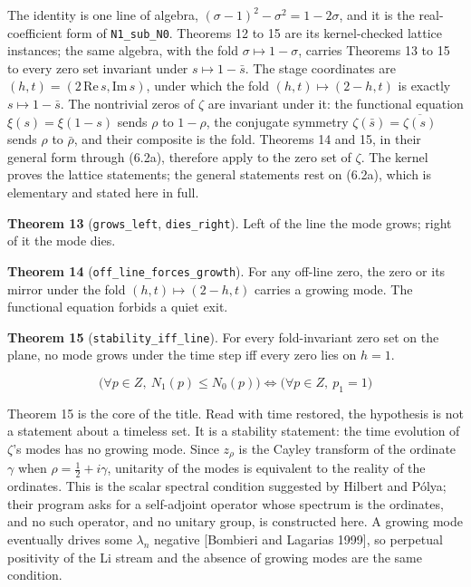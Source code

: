\documentclass[10pt,twocolumn]{article}
\begin{document}
The identity is one line of algebra,
\((\sigma - 1)^2 - \sigma^2 = 1 - 2\sigma\), and it is the
real-coefficient form of \texttt{N1\_sub\_N0}. Theorems 12 to 15 are its
kernel-checked lattice instances; the same algebra, with the fold
\(\sigma \mapsto 1 - \sigma\), carries Theorems 13 to 15 to every zero
set invariant under \(s \mapsto 1 - \bar s\). The stage coordinates are
\((h, t) = (2\,\mathrm{Re}\, s, \mathrm{Im}\, s)\), under which the fold
\((h, t) \mapsto (2 - h, t)\) is exactly \(s \mapsto 1 - \bar s\). The
nontrivial zeros of \(\zeta\) are invariant under it: the functional
equation \(\xi(s) = \xi(1 - s)\) sends \(\rho\) to \(1 - \rho\), the
conjugate symmetry \(\zeta(\bar s) = \overline{\zeta(s)}\) sends
\(\rho\) to \(\bar\rho\), and their composite is the fold. Theorems 14
and 15, in their general form through (6.2a), therefore apply to the
zero set of \(\zeta\). The kernel proves the lattice statements; the
general statements rest on (6.2a), which is elementary and stated here
in full.

\textbf{Theorem 13} (\texttt{grows\_left}, \texttt{dies\_right}). Left
of the line the mode grows; right of it the mode dies.

\textbf{Theorem 14} (\texttt{off\_line\_forces\_growth}). For any
off-line zero, the zero or its mirror under the fold
\((h, t) \mapsto (2 - h, t)\) carries a growing mode. The functional
equation forbids a quiet exit.

\textbf{Theorem 15} (\texttt{stability\_iff\_line}). For every
fold-invariant zero set on the plane, no mode grows under the time step
iff every zero lies on \(h = 1\).

\[\Big(\forall p \in Z,\ N_1(p) \leq N_0(p)\Big) \iff \Big(\forall p \in Z,\ p_1 = 1\Big)\]

Theorem 15 is the core of the title. Read with time restored, the
hypothesis is not a statement about a timeless set. It is a stability
statement: the time evolution of \(\zeta\)'s modes has no growing mode.
Since \(z_\rho\) is the Cayley transform of the ordinate \(\gamma\) when
\(\rho = \tfrac12 + i\gamma\), unitarity of the modes is equivalent to
the reality of the ordinates. This is the scalar spectral condition
suggested by Hilbert and Pólya; their program asks for a self-adjoint
operator whose spectrum is the ordinates, and no such operator, and no
unitary group, is constructed here. A growing mode eventually drives
some \(\lambda_n\) negative {[}Bombieri and Lagarias 1999{]}, so
perpetual positivity of the Li stream and the absence of growing modes
are the same condition.
\end{document}
